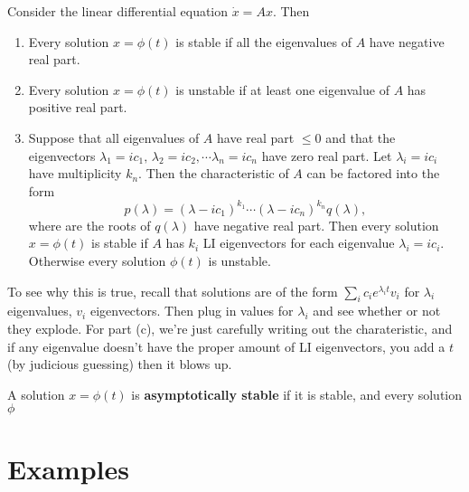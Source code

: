 \begin{theorem}
    Consider the linear differential equation $\dot x=Ax$. Then 
    \begin{enumerate}[label=(\alph*)]
        \item Every solution $x=\phi(t)$ is stable if all the eigenvalues of $A$ have negative real part.
        \item Every solution $x=\phi(t)$ is unstable if at least one eigenvalue of $A$ has positive real part.
        \item Suppose that all eigenvalues of $A$ have real part $\leq 0$ and  that the eigenvectors $\lambda_1=ic_1,\, \lambda_2=ic_2, \cdots \lambda_n =ic_n $ have zero real part. Let $\lambda_i =ic_i $ have multiplicity $k_n $. Then the characteristic of $A$ can be factored into the form \[
                p(\lambda)=(\lambda-ic_1)^{k_1}\cdots (\lambda-ic_n )^{k_n }q(\lambda),
            \] where are the roots of $q(\lambda)$ have negative real part. Then every solution $x=\phi(t)$ is stable if $A$ has $k_i $ LI eigenvectors for each eigenvalue $\lambda_i =ic_i $. Otherwise every solution $\phi(t)$ is unstable.
    \end{enumerate}
\end{theorem}
To see why this is true, recall that solutions are of the form $\sum_{i}^{} c_i e^{\lambda_i t}v_i $ for $\lambda_i $ eigenvalues, $v_i $ eigenvectors. Then plug in values for $\lambda_i $ and see whether or not they explode. For part (c), we're just carefully writing out the charateristic, and if any eigenvalue doesn't have the proper amount of LI eigenvectors, you add a $t$ (by judicious guessing) then it blows up.
\begin{definition}
    A solution $x=\phi(t)$ is \textbf{asymptotically stable} if it is stable, and every solution $\phi$
\end{definition}

\newpage
\section{Examples}

